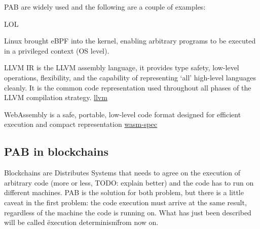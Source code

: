 \documentclass[../main.tex]{subfiles}
\begin{document}
PAB are widely used and the following are a couple of examples:

\begin{description}[style=nextline]
  \item[JVM]
  LOL
  \item[eBPF]
  Linux brought eBPF into the kernel, enabling arbitrary programs to be executed in a privileged context (OS level).
  \item[LLVM IR]
  LLVM IR is the LLVM assembly language, it provides type safety, low-level operations, flexibility, and the capability of representing ‘all’ high-level languages cleanly. It is the common code representation used throughout all phases of the LLVM compilation strategy. \href{https://llvm.org/docs/LangRef.html\#abstract)}{llvm}
  \item[WASM]
  WebAssembly is a safe, portable, low-level code format designed for efficient execution and compact representation \href{https://webassembly.github.io/spec/core/}{wasm-spec}
\end{description}

\subsection{PAB in blockchains}

Blockchains are Distributes Systems that needs to agree on the execution of arbitrary code (more or less, TODO: explain better) and the code has to run on different machines. PAB is the solution for both problem, but there is a little caveat in the first problem: the code execution must arrive at the same result, regardless of the machine the code is running on. What has just been described will be called \"execution determinism\" from now on.
\end{document}
